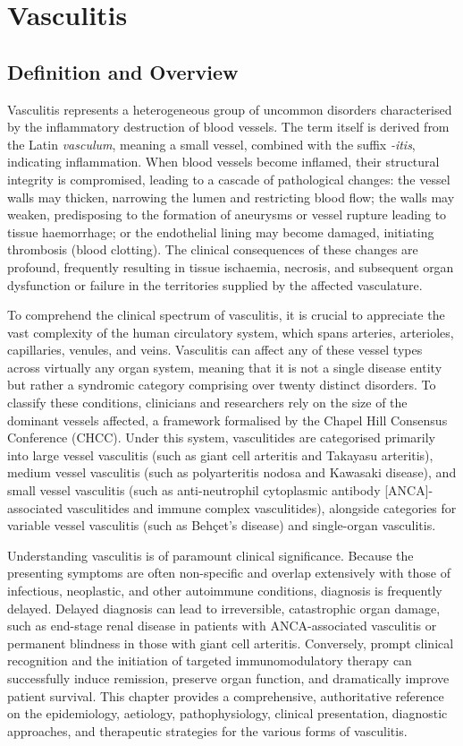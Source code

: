 \chapter{Vasculitis}

\section*{Definition and Overview}
Vasculitis represents a heterogeneous group of uncommon disorders characterised by the inflammatory destruction of blood vessels. The term itself is derived from the Latin \textit{vasculum}, meaning a small vessel, combined with the suffix \textit{-itis}, indicating inflammation. When blood vessels become inflamed, their structural integrity is compromised, leading to a cascade of pathological changes: the vessel walls may thicken, narrowing the lumen and restricting blood flow; the walls may weaken, predisposing to the formation of aneurysms or vessel rupture leading to tissue haemorrhage; or the endothelial lining may become damaged, initiating thrombosis (blood clotting). The clinical consequences of these changes are profound, frequently resulting in tissue ischaemia, necrosis, and subsequent organ dysfunction or failure in the territories supplied by the affected vasculature.

To comprehend the clinical spectrum of vasculitis, it is crucial to appreciate the vast complexity of the human circulatory system, which spans arteries, arterioles, capillaries, venules, and veins. Vasculitis can affect any of these vessel types across virtually any organ system, meaning that it is not a single disease entity but rather a syndromic category comprising over twenty distinct disorders. To classify these conditions, clinicians and researchers rely on the size of the dominant vessels affected, a framework formalised by the Chapel Hill Consensus Conference (CHCC). Under this system, vasculitides are categorised primarily into large vessel vasculitis (such as giant cell arteritis and Takayasu arteritis), medium vessel vasculitis (such as polyarteritis nodosa and Kawasaki disease), and small vessel vasculitis (such as anti-neutrophil cytoplasmic antibody [ANCA]-associated vasculitides and immune complex vasculitides), alongside categories for variable vessel vasculitis (such as Beh\c{c}et's disease) and single-organ vasculitis.

Understanding vasculitis is of paramount clinical significance. Because the presenting symptoms are often non-specific and overlap extensively with those of infectious, neoplastic, and other autoimmune conditions, diagnosis is frequently delayed. Delayed diagnosis can lead to irreversible, catastrophic organ damage, such as end-stage renal disease in patients with ANCA-associated vasculitis or permanent blindness in those with giant cell arteritis. Conversely, prompt clinical recognition and the initiation of targeted immunomodulatory therapy can successfully induce remission, preserve organ function, and dramatically improve patient survival. This chapter provides a comprehensive, authoritative reference on the epidemiology, aetiology, pathophysiology, clinical presentation, diagnostic approaches, and therapeutic strategies for the various forms of vasculitis.

